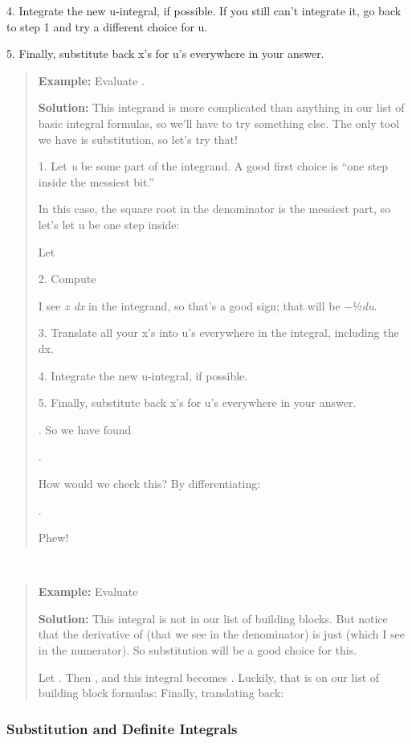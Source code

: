 4. Integrate the new u-integral, if possible. If you still can't
integrate it, go back to step 1 and try a different choice for u.

5. Finally, substitute back x's for u's everywhere in your answer.

\begin{quote}
\textbf{Example:} Evaluate .

\textbf{Solution:} This integrand is more complicated than anything in
our list of basic integral formulas, so we'll have to try something
else. The only tool we have is substitution, so let's try that!

1. Let \emph{u} be some part of the integrand. A good first choice is
``one step inside the messiest bit.''

In this case, the square root in the denominator is the messiest part,
so let's let u be one step inside:

Let

2. Compute

I see \emph{x dx} in the integrand, so that's a good sign; that will be
−½\emph{du}.

3. Translate all your x's into u's everywhere in the integral, including
the dx.

4. Integrate the new u-integral, if possible.

5. Finally, substitute back x's for u's everywhere in your answer.

. So we have found

.

How would we check this? By differentiating:

.

Phew!
\end{quote}

\textbf{\\
}

\begin{quote}
\textbf{Example:} Evaluate

\textbf{Solution:} This integral is not in our list of building blocks.
But notice that the derivative of (that we see in the denominator) is
just (which I see in the numerator). So substitution will be a good
choice for this.

Let . Then , and this integral becomes . Luckily, that is on our list of
building block formulas: Finally, translating back:
\end{quote}

\subsubsection{Substitution and Definite
Integrals}\label{substitution-and-definite-integrals}

